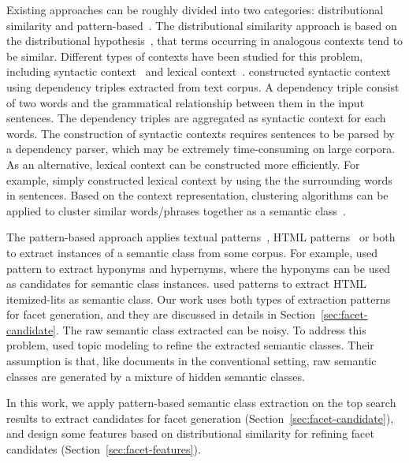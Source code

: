 Existing approaches can be roughly divided into two categories: distributional similarity and pattern-based~\cite{shi2010corpus}. The distributional similarity approach is based on the distributional hypothesis~\cite{Harris}, that terms occurring in analogous contexts tend to be similar. Different types of contexts have been studied for this problem, including syntactic context~\cite{lin1998automatic,pantel2002discovering} and lexical context~\cite{pantel2004towards,agirre2009study,pantel2009web}. \citet{lin1998automatic} constructed syntactic context using dependency triples extracted from text corpus. A dependency triple consist of two words and the grammatical relationship between them in the input sentences. The dependency triples are aggregated as syntactic context for each words. The construction of syntactic contexts requires sentences to be parsed by a dependency parser, which may be extremely time-consuming on large corpora. As an alternative, lexical context can be constructed more efficiently. For 
example, \citet{agirre2009study} simply constructed lexical context by using the the surrounding words in sentences. Based on the context representation, clustering algorithms can be applied to cluster similar words/phrases together as a semantic class~\cite{pantel2002discovering}.


The pattern-based approach applies textual patterns~\cite{hearst1992automatic,pasca2004acquisition}, HTML patterns~\cite{shinzato2005simple} or both~\cite{zhang2009employing,shi2010corpus} to extract instances of a semantic class from some corpus. For example, \citet{hearst1992automatic} used pattern  to extract hyponyms and hypernyms, where the hyponyms can be used as candidates for semantic class instances. \citet{shinzato2005simple} used patterns to extract HTML itemized-lits as semantic class. Our work uses both types of extraction patterns for facet generation, and they are discussed in details in Section~\ref{sec:facet-candidate}. The raw semantic class extracted can be noisy. To address this problem, \citet{zhang2009employing} used topic modeling to refine the extracted semantic classes. Their assumption is that, like documents in the conventional setting, raw semantic classes are generated by a mixture of hidden semantic classes.

In this work, we apply pattern-based semantic class extraction on the top search results to extract candidates for facet generation (Section~\ref{sec:facet-candidate}), and design some features based on distributional similarity for refining facet candidates (Section~\ref{sec:facet-features}).


